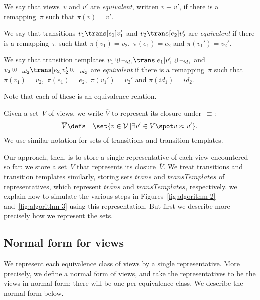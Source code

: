 
\begin{definition}
We say that views~$v$ and $v'$ are \emph{equivalent}, written $v \equiv v'$,
if there is a remapping~$\pi$ such that $\pi(v) = v'$. 

We say that transitions $v_1 \trans[e_1] v_1'$ and $v_2 \trans[e_2] v_2'$ are
\emph{equivalent} if there is a remapping~$\pi$ such that $\pi(v_1) = v_2$,\,
$\pi(e_1) = e_2$ and $\pi(v_1') = v_2'$.

We say that transition templates $v_1 \uplus \hole{id_1} \trans[e_1] v_1'
\uplus \hole{id_1}$ and $v_2 \uplus \hole{id_2} \trans[e_2] v_2' \uplus
\hole{id_2}$ are \emph{equivalent} if there is a remapping~$\pi$ such that
$\pi(v_1) = v_2$,\, $\pi(e_1) = e_2$,\, $\pi(v_1') = v_2'$ and $\pi(id_1) = id_2$.

Note that each of these is an equivalence relation.

Given a set~$V$ of views, we write $\overline{V}$ to represent its closure
under~$\equiv$:
%
\begin{eqnarray*}
\overline{V} & \defs & \set{v \in \V \| \exists v' \in V \spot v \equiv v'}.
\end{eqnarray*}
%
We use similar notation for sets of transitions and transition templates.
\end{definition}



Our approach, then, is to store a single representative of each view
encountered so far: we store a set~$V$ that represents its
closure~$\overline{V}$.  We treat transitions and transition templates
similarly, storing sets $trans$ and $transTemplates$ of representatives, which
represent $\overline{trans}$ and $\overline{transTemplates}$, respectively.
%
 we explain how to simulate the various steps in
Figures~\ref{fig:algorithm-2} and~\ref{fig:algorithm-3} using this
representation. 
%
But first we describe more precisely how we represent the sets. 




\subsection{Normal form for views}

We represent each equivalence class of views by a single representative.  More
precisely, we define a normal form of views, and take the representatives to
be the views in normal form: there will be one per equivalence class.  We
describe the normal form below. 

